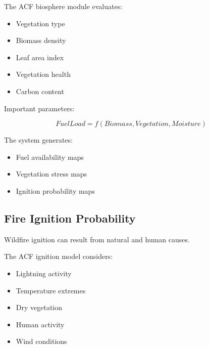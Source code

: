 The ACF biosphere module evaluates:

\begin{itemize}

\item Vegetation type

\item Biomass density

\item Leaf area index

\item Vegetation health

\item Carbon content

\end{itemize}


Important parameters:

\[
FuelLoad=f(Biomass,Vegetation,Moisture)
\]


The system generates:

\begin{itemize}

\item Fuel availability maps

\item Vegetation stress maps

\item Ignition probability maps

\end{itemize}



\subsection{Fire Ignition Probability}

Wildfire ignition can result from natural and human causes.

The ACF ignition model considers:

\begin{itemize}

\item Lightning activity

\item Temperature extremes

\item Dry vegetation

\item Human activity

\item Wind conditions

\end{itemize}


